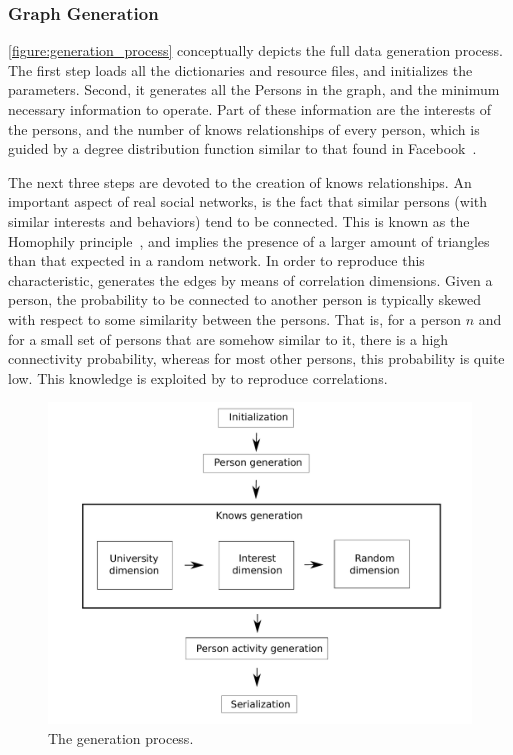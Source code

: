 \subsubsection{Graph Generation}

\autoref{figure:generation_process} conceptually depicts the full data
generation process. The first step loads all the dictionaries and resource
files, and initializes the \datagen parameters.  Second, it generates all the
Persons in the graph, and the minimum necessary information to operate. Part of
these information are the interests of the persons, and the number of knows
relationships of every person, which is guided by a degree distribution
function similar to that found in Facebook~\cite{facebook_anatomy}.

The next three steps are devoted to the creation of knows relationships.  An
important aspect of real social networks, is the fact that similar persons
(with similar interests and behaviors) tend to be connected. This is known as
the Homophily principle~\cite{mcpherson2001birds,DBLP:journals/socnet/BaroneC18}, and implies the presence of
a larger amount of triangles than that expected in a random network. In order
to reproduce this characteristic, \datagen generates the edges by means of
correlation dimensions.  Given a person, the probability to be connected to
another person is typically skewed with respect to some similarity between the
persons. That is, for a person $n$ and for a small set of persons that are
somehow similar to it, there is a high connectivity probability, whereas for
most other persons, this probability is quite low. This knowledge is
exploited by \datagen to reproduce correlations.

\begin{figure}[H]
    \centering
    \includegraphics[width=1\linewidth]{figures/sndg/execution.pdf}
    \caption{The \datagen generation process.}
    \label{figure:generation_process}
\end{figure}

